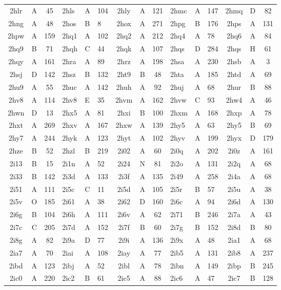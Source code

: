 \begin{longtable}{|c|c|c| a|a|a| c|c|c| a|a|a| c|c|c|}
2hlr & A & 45 & 2hls & A & 104 & 2hly & A & 121 & 2hmc & A & 147 & 2hmq & D & 82\\
2hng & A & 48 & 2hos & B & 8 & 2hox & A & 271 & 2hpg & B & 176 & 2hps & A & 131\\
2hpw & A & 159 & 2hq1 & A & 102 & 2hq2 & A & 212 & 2hq4 & A & 78 & 2hq6 & A & 84\\
2hq9 & B & 71 & 2hqh & C & 44 & 2hqk & A & 107 & 2hqs & D & 284 & 2hqs & H & 61\\
2hqy & A & 161 & 2hra & A & 89 & 2hrz & A & 198 & 2hsa & A & 230 & 2hsb & A & 3\\
2hsj & D & 142 & 2hsz & B & 132 & 2ht9 & B & 48 & 2hta & A & 185 & 2htd & A & 69\\
2hu9 & A & 55 & 2huc & A & 142 & 2huh & A & 92 & 2huj & A & 68 & 2hur & B & 88\\
2hv8 & A & 114 & 2hv8 & E & 35 & 2hvm & A & 162 & 2hvw & C & 93 & 2hw4 & A & 46\\
2hwn & D & 13 & 2hx5 & A & 81 & 2hxi & B & 100 & 2hxm & A & 168 & 2hxp & A & 78\\
2hxt & A & 269 & 2hxv & A & 167 & 2hxw & A & 139 & 2hy5 & A & 63 & 2hy5 & B & 69\\
2hy7 & A & 244 & 2hyk & A & 123 & 2hyt & A & 102 & 2hyv & A & 199 & 2hyx & D & 179\\
2hze & B & 52 & 2hzl & B & 219 & 2i02 & A & 60 & 2i0q & A & 202 & 2i0z & A & 161\\
2i13 & B & 15 & 2i1n & A & 52 & 2i24 & N & 81 & 2i2o & A & 131 & 2i2q & A & 68\\
2i33 & B & 142 & 2i3d & A & 133 & 2i3f & A & 135 & 2i49 & A & 258 & 2i4a & A & 68\\
2i51 & A & 111 & 2i5c & C & 11 & 2i5d & A & 105 & 2i5r & B & 57 & 2i5u & A & 38\\
2i5v & O & 185 & 2i61 & A & 38 & 2i62 & D & 160 & 2i6c & A & 94 & 2i6d & A & 130\\
2i6g & B & 104 & 2i6h & A & 111 & 2i6v & A & 62 & 2i71 & B & 246 & 2i7a & A & 43\\
2i7c & C & 205 & 2i7d & A & 152 & 2i7f & B & 60 & 2i7g & B & 152 & 2i8d & B & 80\\
2i8g & A & 82 & 2i9a & D & 77 & 2i9i & A & 136 & 2i9x & A & 48 & 2ia1 & A & 68\\
2ia7 & A & 70 & 2iai & A & 108 & 2iay & A & 77 & 2ib5 & A & 131 & 2ib8 & A & 237\\
2ibd & A & 123 & 2ibj & A & 52 & 2ibl & A & 78 & 2ibn & A & 149 & 2ibp & B & 245\\
2ic0 & A & 220 & 2ic2 & B & 61 & 2ic5 & A & 88 & 2ic6 & A & 47 & 2ic7 & B & 128\\

\end{longtable}
